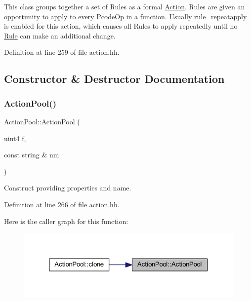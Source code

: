 This class groups together a set of Rules as a formal \mbox{\hyperlink{class_action}{Action}}. Rules are given an opportunity to apply to every \mbox{\hyperlink{class_pcode_op}{Pcode\+Op}} in a function. Usually rule\+\_\+repeatapply is enabled for this action, which causes all Rules to apply repeatedly until no \mbox{\hyperlink{class_rule}{Rule}} can make an additional change. 

Definition at line 259 of file action.\+hh.



\subsection{Constructor \& Destructor Documentation}
\mbox{\label{class_action_pool_a050edf2dac4b4a89581615b8432b903e}} 
\subsubsection{\texorpdfstring{ActionPool()}{ActionPool()}}
{\footnotesize\ttfamily Action\+Pool\+::\+Action\+Pool (\begin{DoxyParamCaption}\item[{uint4}]{f,  }\item[{const string \&}]{nm }\end{DoxyParamCaption})\hspace{0.3cm}{\ttfamily [inline]}}



Construct providing properties and name. 



Definition at line 266 of file action.\+hh.

Here is the caller graph for this function\+:
\nopagebreak
\begin{figure}[H]
\begin{center}
\leavevmode
\includegraphics[width=326pt]{class_action_pool_a050edf2dac4b4a89581615b8432b903e_icgraph}
\end{center}
\end{figure}
\mbox{\label{class_action_pool_a57593c805f7486f07eeb40598e814700}} 
